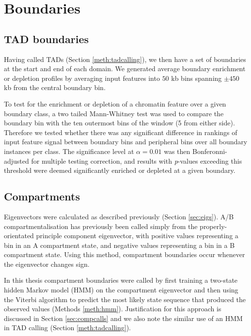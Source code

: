 \documentclass[a4paper,11pt,oneside]{book}
\begin{document}
\section{Boundaries}\label{boundaries}

\subsection{TAD boundaries}\label{meth:tadbounds}

Having called TADs (Section \ref{meth:tadcalling}), we then have a set of boundaries at the start and end of each domain. We generated average boundary enrichment or depletion profiles by averaging input features into $50$ kb bins spanning $\pm450$ kb from the central boundary bin.

To test for the enrichment or depletion of a chromatin feature over a
given boundary class, a two tailed Mann-Whitney test was used to compare the
boundary bin with the ten outermost bins of the window (5 from either
side). Therefore we tested whether there was any significant difference in rankings of input feature signal between boundary bins and peripheral bins over all boundary instances per class. The significance level at $\alpha = 0.01$ was then
Bonferonni-adjusted for multiple testing correction, and results with
\emph{p}-values exceeding this threshold were deemed significantly
enriched or depleted at a given boundary.

\subsection{Compartments}\label{meth:compartments}

Eigenvectors were calculated as described previously (Section \ref{sec:eigs}). A/B compartmentalisation has previously been called simply from the properly-orientated principle component eigenvector, with positive values representing a bin in an A compartment state, and negative values representing a bin in a B compartment state.\cite{Lieberman2009} Using this method, compartment boundaries occur whenever the eigenvector changes sign.

In this thesis compartment boundaries were called by first training a two-state hidden
Markov model (HMM) on the compartment eigenvector and then using the
Viterbi algorithm to predict the most likely state sequence that
produced the observed values (Methods \ref{meth:hmm}). Justification for this approach is discussed in Section \ref{sec:compcalls} and we also note the similar use of an HMM in TAD calling (Section \ref{meth:tadcalling}).
\end{document}
